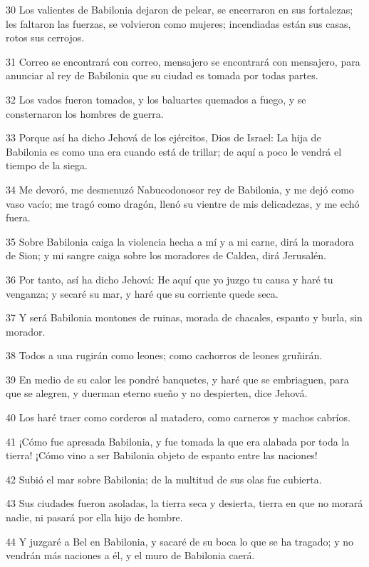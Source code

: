 \par 30 Los valientes de Babilonia dejaron de pelear, se encerraron en sus fortalezas; les faltaron las fuerzas, se volvieron como mujeres; incendiadas están sus casas, rotos sus cerrojos.
\par 31 Correo se encontrará con correo, mensajero se encontrará con mensajero, para anunciar al rey de Babilonia que su ciudad es tomada por todas partes.
\par 32 Los vados fueron tomados, y los baluartes quemados a fuego, y se consternaron los hombres de guerra.
\par 33 Porque así ha dicho Jehová de los ejércitos, Dios de Israel: La hija de Babilonia es como una era cuando está de trillar; de aquí a poco le vendrá el tiempo de la siega.
\par 34 Me devoró, me desmenuzó Nabucodonosor rey de Babilonia, y me dejó como vaso vacío; me tragó como dragón, llenó su vientre de mis delicadezas, y me echó fuera.
\par 35 Sobre Babilonia caiga la violencia hecha a mí y a mi carne, dirá la moradora de Sion; y mi sangre caiga sobre los moradores de Caldea, dirá Jerusalén.
\par 36 Por tanto, así ha dicho Jehová: He aquí que yo juzgo tu causa y haré tu venganza; y secaré su mar, y haré que su corriente quede seca.
\par 37 Y será Babilonia montones de ruinas, morada de chacales, espanto y burla, sin morador.
\par 38 Todos a una rugirán como leones; como cachorros de leones gruñirán.
\par 39 En medio de su calor les pondré banquetes, y haré que se embriaguen, para que se alegren, y duerman eterno sueño y no despierten, dice Jehová.
\par 40 Los haré traer como corderos al matadero, como carneros y machos cabríos.
\par 41 ¡Cómo fue apresada Babilonia, y fue tomada la que era alabada por toda la tierra! ¡Cómo vino a ser Babilonia objeto de espanto entre las naciones!
\par 42 Subió el mar sobre Babilonia; de la multitud de sus olas fue cubierta.
\par 43 Sus ciudades fueron asoladas, la tierra seca y desierta, tierra en que no morará nadie, ni pasará por ella hijo de hombre.
\par 44 Y juzgaré a Bel en Babilonia, y sacaré de su boca lo que se ha tragado; y no vendrán más naciones a él, y el muro de Babilonia caerá.

